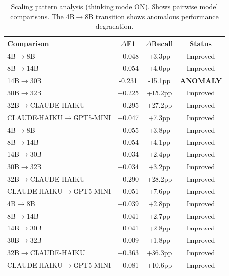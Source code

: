 \begin{table}[t]
\centering
\small
\caption{Scaling pattern analysis (thinking mode ON). Shows pairwise model comparisons. The 4B$\rightarrow$8B transition shows anomalous performance degradation.}
\label{tab:scaling_anomaly}
\begin{tabular}{lccc}
\toprule
\textbf{Comparison} & \textbf{$\Delta$F1} & \textbf{$\Delta$Recall} & \textbf{Status} \\
\midrule
4B$\rightarrow$8B & +0.048 & +3.3pp & Improved \\
8B$\rightarrow$14B & +0.054 & +4.0pp & Improved \\
14B$\rightarrow$30B & -0.231 & -15.1pp & \textbf{ANOMALY} \\
30B$\rightarrow$32B & +0.225 & +15.2pp & Improved \\
32B$\rightarrow$CLAUDE-HAIKU & +0.295 & +27.2pp & Improved \\
CLAUDE-HAIKU$\rightarrow$GPT5-MINI & +0.047 & +7.3pp & Improved \\
4B$\rightarrow$8B & +0.055 & +3.8pp & Improved \\
8B$\rightarrow$14B & +0.054 & +4.1pp & Improved \\
14B$\rightarrow$30B & +0.034 & +2.4pp & Improved \\
30B$\rightarrow$32B & +0.034 & +3.2pp & Improved \\
32B$\rightarrow$CLAUDE-HAIKU & +0.290 & +28.2pp & Improved \\
CLAUDE-HAIKU$\rightarrow$GPT5-MINI & +0.051 & +7.6pp & Improved \\
4B$\rightarrow$8B & +0.039 & +2.8pp & Improved \\
8B$\rightarrow$14B & +0.041 & +2.7pp & Improved \\
14B$\rightarrow$30B & +0.041 & +2.8pp & Improved \\
30B$\rightarrow$32B & +0.009 & +1.8pp & Improved \\
32B$\rightarrow$CLAUDE-HAIKU & +0.363 & +36.3pp & Improved \\
CLAUDE-HAIKU$\rightarrow$GPT5-MINI & +0.081 & +10.6pp & Improved \\
\bottomrule
\end{tabular}
\end{table}





